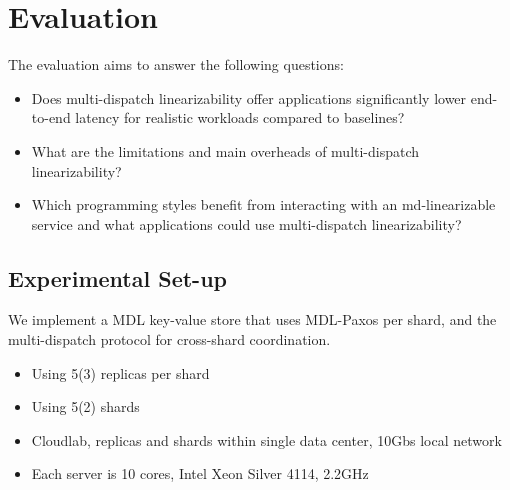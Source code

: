 \usepackage{graphicx}
\section{Evaluation}
\label{sec:eval}

The evaluation aims to answer the following questions:

\begin{itemize}
\item Does multi-dispatch linearizability offer applications significantly lower end-to-end latency for realistic workloads compared to baselines?

\item What are the limitations and main overheads of multi-dispatch linearizability?

\item Which programming styles benefit from interacting with an md-linearizable service and what applications could use multi-dispatch linearizability?
\end{itemize}

\subsection{Experimental Set-up}
We implement a MDL key-value store that uses MDL-Paxos per shard, and the multi-dispatch protocol for cross-shard coordination.
\begin{itemize}
    \item Using 5(3) replicas per shard
    \item Using 5(2) shards
    \item Cloudlab, replicas and shards within single data center, 10Gbs local network
    \item Each server is 10 cores, Intel Xeon Silver 4114, 2.2GHz
\end{itemize}
